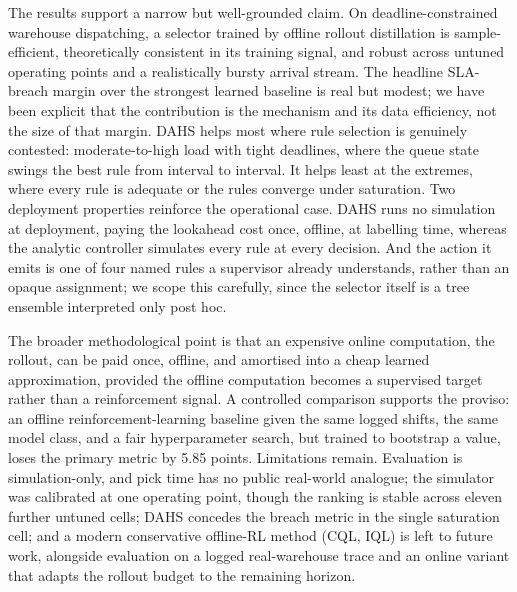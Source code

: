 \documentclass[conference]{IEEEtran}
\begin{document}
The results support a narrow but well-grounded claim. On deadline-constrained
warehouse dispatching, a selector trained by offline rollout distillation is
sample-efficient, theoretically consistent in its training signal, and robust
across untuned operating points and a realistically bursty arrival stream. The
headline SLA-breach margin over the strongest learned baseline is real but modest;
we have been explicit that the contribution is the mechanism and its data
efficiency, not the size of that margin. DAHS helps most where rule selection is
genuinely contested: moderate-to-high load with tight deadlines, where the queue
state swings the best rule from interval to interval. It helps least at the
extremes, where every rule is adequate or the rules converge under saturation. Two
deployment properties reinforce the operational case. DAHS runs no simulation at
deployment, paying the lookahead cost once, offline, at labelling time, whereas the
analytic controller simulates every rule at every decision. And the action it emits
is one of four named rules a supervisor already understands, rather than an opaque
assignment; we scope this carefully, since the selector itself is a tree ensemble
interpreted only post hoc.

The broader methodological point is that an expensive online computation, the
rollout, can be paid once, offline, and amortised into a cheap learned
approximation, provided the offline computation becomes a supervised target rather
than a reinforcement signal. A controlled comparison supports the proviso: an
offline reinforcement-learning baseline given the same logged shifts, the same model
class, and a fair hyperparameter search, but trained to bootstrap a value, loses the
primary metric by 5.85 points. Limitations remain. Evaluation is simulation-only,
and pick time has no public real-world analogue; the simulator was calibrated at one
operating point, though the ranking is stable across eleven further untuned cells;
DAHS concedes the breach metric in the single saturation cell; and a modern
conservative offline-RL method (CQL, IQL) is left to future work, alongside
evaluation on a logged real-warehouse trace and an online variant that adapts the
rollout budget to the remaining horizon.



\end{document}
